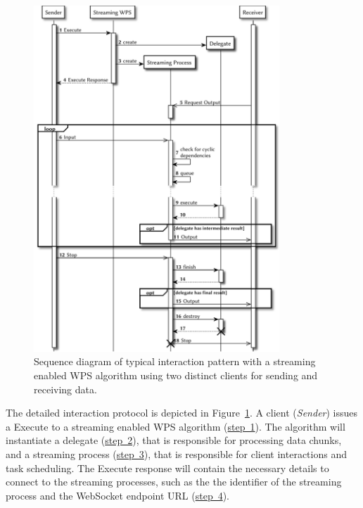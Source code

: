 	\begin{figure}[!htb]
		\centering
		\includegraphics[width=0.82253521126760565\textwidth]{figures/sequence-diagramm-swps.pdf}
		\caption{\label{fig:sd:swps} Sequence diagram of typical interaction pattern with a streaming enabled WPS algorithm using two distinct clients for sending and receiving data.}
	\end{figure}

	The detailed interaction protocol is depicted in Figure~\ref{fig:sd:swps}. A client (\emph{Sender}) issues a Execute to a streaming enabled WPS algorithm (\hyperref[fig:sd:swps]{step~1}). The algorithm will instantiate a delegate (\hyperref[fig:sd:swps]{step~2}), that is responsible for processing data chunks, and a streaming process (\hyperref[fig:sd:swps]{step~3}), that is responsible for client interactions and task scheduling. The Execute response will contain the necessary details to connect to the streaming processes, such as the the identifier of the streaming process and the WebSocket endpoint URL (\hyperref[fig:sd:swps]{step~4}).

